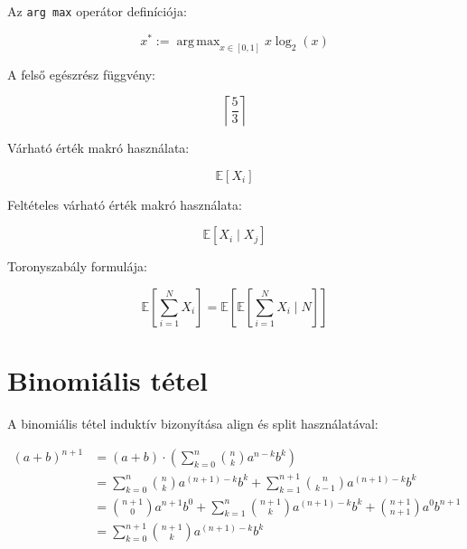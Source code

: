 \documentclass{article}
\theoremstyle{definition}
\DeclareMathOperator*{\argmax}{arg\,max}
\newcommand{\E}[1]{\mathbb{E}\left[#1\right]}
\newcommand{\CE}[2]{\mathbb{E}\left[#1 \mid #2\right]}
\begin{document}
Az \texttt{arg max} operátor definíciója:

\[
x^* := \argmax_{x \in [0,1]} x \log_2(x)
\]

A felső egészrész függvény:

\[
\left\lceil \frac{5}{3} \right\rceil
\]

Várható érték makró használata:

\[
\E{X_i}
\]

Feltételes várható érték makró használata:

\[
\CE{X_i}{X_j}
\]

Toronyszabály formulája:

\[
\mathbb{E}\left[\sum_{i=1}^N X_i\right] = \mathbb{E}\left[\mathbb{E}\left[\sum_{i=1}^N X_i \mid N\right]\right]
\]

\section{Binomiális tétel}

A binomiális tétel induktív bizonyítása align és split használatával:

\begin{align}
(a+b)^{n+1} &= (a+b) \cdot \left( \sum_{k=0}^{n} \binom{n}{k} a^{n-k} b^k \right) \label{eq:binom1}\\
&= \sum_{k=0}^{n} \binom{n}{k} a^{(n+1)-k} b^k + \sum_{k=1}^{n+1} \binom{n}{k-1} a^{(n+1)-k} b^k \label{eq:binom2}\\
&= \binom{n+1}{0} a^{n+1} b^0 + \sum_{k=1}^{n} \binom{n+1}{k} a^{(n+1)-k} b^k + \binom{n+1}{n+1} a^0 b^{n+1} \label{eq:binom3}\\
&= \sum_{k=0}^{n+1} \binom{n+1}{k} a^{(n+1)-k} b^k \label{eq:binom4}
\end{align}
\end{document}
